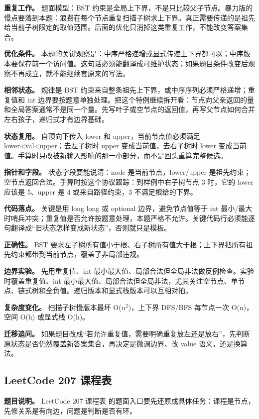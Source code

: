 \textbf{重复工作。} 题面模型：BST 约束是全局上下界，不是只比较父子节点。暴力版的慢点要落到本题：浪费在每个节点重复扫描子树求上下界。真正需要传递的是祖先给当前子树限定的取值范围。后面的优化只消掉这类重复工作，不能改变答案集合。

\textbf{优化条件。} 本题的关键观察是：中序严格递增或显式传递上下界都可以；中序版本要保存前一个访问值。这句话必须能翻译成可维护状态；如果题目条件改变后观察不再成立，就不能继续套原来的写法。

\textbf{相邻状态。} 规律是 BST 约束来自整条祖先上下界，或中序序列必须严格递增；重复值和 int 边界要按题意单独处理。把这个特例继续拆开看：节点向父亲返回的量和全局答案通常不是同一个量。先写叶子或空节点的返回值，再写父节点如何合并左右孩子，递归式才有边界基础。

\textbf{状态复用。} 自顶向下传入 lower 和 upper，当前节点值必须满足 lower<val<upper；去左子树时 upper 变成当前值，去右子树时 lower 变成当前值。手算时只改被新输入影响的那一小部分，而不是回头重算完整候选。

\textbf{指针和字段。} 状态字段要能说清：node 是当前节点，lower/upper 是祖先约束；空节点返回合法。手算时按这个协议跟踪：到样例中右子树节点 3 时，它的 lower 应该是 5、upper 是 4 或来自路径约束，3 不满足根给的下界。

\textbf{代码落点。} 关键是用 long long 或 optional 边界，避免节点值等于 int 最小/最大时哨兵冲突；重复值是否允许按题意处理，本题严格不允许。关键代码行必须能逐句翻译成“旧状态怎样变成新状态”，否则就只是模板。

\textbf{正确性。} BST 要求左子树所有值小于根、右子树所有值大于根；上下界把所有祖先约束都带到当前节点，覆盖了非局部违规。

\textbf{边界实验。} 先用重复值、int 最小最大值、局部合法但全局非法做反例检查。实验时覆盖重复值、int 最小最大值、局部合法但全局非法，尤其关注空节点、单节点、链式树和全负值。递归版本和显式栈版本可以互相对拍。

\textbf{复杂度变化。} 扫描子树慢版本最坏 O(\ensuremath{n^{2}})，上下界 DFS/BFS 每节点一次 O(n)，空间 O(h) 或显式栈 O(h)。

\textbf{迁移追问。} 如果题目改成“若允许重复值，需要明确重复放左还是放右”，先判断原状态是否仍然覆盖新答案集合，再决定是微调边界、改 value 语义，还是换算法。

\subsection{LeetCode 207 课程表}

\textbf{题目说明。} LeetCode 207 课程表 的题面入口要先还原成具体任务：课程是节点，先修关系是有向边，问题是判断是否有环。

